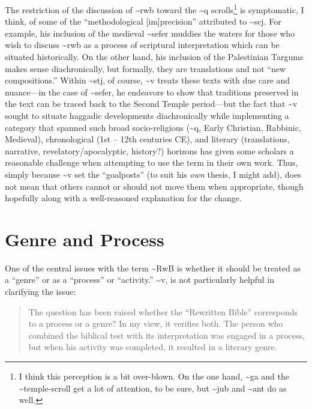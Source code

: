 The restriction of the discussion of \textasciitilde{}rwb toward the
\textasciitilde{}q scrolls\footnote{I think this perception is a bit
  over-blown. On the one hand, \textasciitilde{}ga and the
  \textasciitilde{}temple-scroll get a lot of attention, to be sure, but
  \textasciitilde{}jub and \textasciitilde{}ant do as well.} is
symptomatic, I think, of some of the ``methodological
{[}im{]}precision'' attributed to \textasciitilde{}scj. For example, his
inclusion of the medieval \textasciitilde{}sefer muddies the waters for
those who wish to discuss \textasciitilde{}rwb as a process of
scriptural interpretation which can be situated historically. On the
other hand, his inclusion of the Palestinian Targums makes sense
diachronically, but formally, they are translations and not ``new
compositions.'' Within \textasciitilde{}stj, of course,
\textasciitilde{}v treats these texts with due care and nuance---in the
case of \textasciitilde{}sefer, he endeavors to show that traditions
preserved in the text can be traced back to the Second Temple
period---but the fact that \textasciitilde{}v sought to situate haggadic
developments diachronically while implementing a category that spanned
such broad socio-religious (\textasciitilde{}q, Early Christian,
Rabbinic, Medieval), chronological (1st -- 12th centuries CE), and
literary (translations, narrative, revelatory/apocalyptic, history?)
horizons has given some scholars a reasonable challenge when attempting
to use the term in their own work. Thus, simply because
\textasciitilde{}v set the ``goalposts'' (to suit his \emph{own} thesis,
I might add), does not mean that others cannot or should not move them
when appropriate, though hopefully along with a well-reasoned
explanation for the change.

\section{Genre and Process}\label{genre-and-process}

One of the central issues with the term \textasciitilde{}RwB is whether
it should be treated as a ``genre'' or as a ``process'' or ``activity.''
\textasciitilde{}v, is not particularly helpful in clarifying the issue:

\begin{quote}
The question has been raised whether the ``Rewritten Bible'' corresponds
to a process or a genre? In my view, it verifies both. The person who
combined the biblical test with its interpretation was engaged in a
process, but when his activity was completed, it resulted in a literary
genre.\autocite[8]{vermes_zsengeller2014}
\end{quote}

